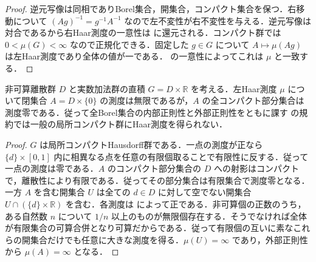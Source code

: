 \begin{proof}
逆元写像は同相でありBorel集合，開集合，コンパクト集合を保つ．右移動について $(Ag)^{-1}=g^{-1}A^{-1}$ なので左不変性が右不変性を与える．逆元写像は対合であるから右Haar測度の一意性は  に還元される．コンパクト群では $0<\mu(G)<\infty$ なので正規化できる．固定した $g\in G$ について $A\mapsto\mu(Ag)$ は左Haar測度であり全体の値が一である． の一意性によってこれは $\mu$ と一致する．
\end{proof}
\begin{example}[非σコンパクト群における正則性の相違]
非可算離散群 $D$ と実数加法群の直積 $G=D\times\mathbb R$ を考える．左Haar測度 $\mu$ について閉集合 $A=D\times\{0\}$ の測度は無限であるが，$A$ の全コンパクト部分集合は測度零である．従って全Borel集合の内部正則性と外部正則性をともに課す  の規約では一般の局所コンパクト群にHaar測度を得られない．
\end{example}
\begin{proof}
$G$ は局所コンパクトHausdorff群である．一点の測度が正なら $\{d\}\times[0,1]$ 内に相異なる点を任意の有限個取ることで有限性に反する．従って一点の測度は零である．$A$ のコンパクト部分集合の $D$ への射影はコンパクトで，離散性により有限である．従ってその部分集合は有限集合で測度零となる．一方 $A$ を含む開集合 $U$ は全ての $d\in D$ に対して空でない開集合 $U\cap(\{d\}\times\mathbb R)$ を含む．各測度は  によって正である．非可算個の正数のうち，ある自然数 $n$ について $1/n$ 以上のものが無限個存在する．そうでなければ全体が有限集合の可算合併となり可算だからである．従って有限個の互いに素なこれらの開集合だけでも任意に大きな測度を得る．$\mu(U)=\infty$ であり，外部正則性から $\mu(A)=\infty$ となる．
\end{proof}
